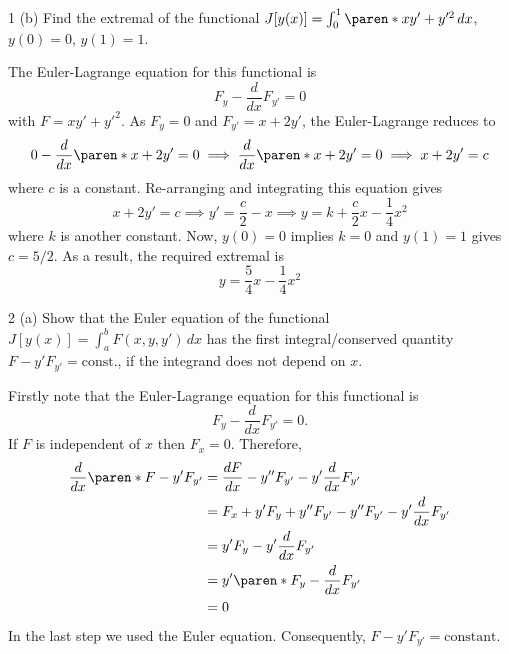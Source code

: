 \documentclass[11pt]{penrose}
\begin{document}
\begin{problem}{1 (b)}
    Find the extremal of the functional $J[y(x)] = \int_0^1 \paren*{xy' + y'^2} \,dx$, $y(0) = 0$, $y(1) = 1$.

    \solution The Euler-Lagrange equation for this functional is
    \begin{equation*}
        F_{y} - \frac{d}{dx}F_{y'}= 0
    \end{equation*}
    with $F = xy' + y'^2$. As $F_{y} = 0$ and $F_{y'} = x + 2y'$, the Euler-Lagrange reduces to
    \begin{equation*}
        0 - \frac{d}{dx}\paren*{x + 2y'}= 0
        \implies
        \frac{d}{dx}\paren*{x + 2y'}= 0
        \implies
        x + 2y' = c
    \end{equation*}
    where $c$ is a constant. Re-arranging and integrating this equation gives
    \begin{equation*}
        x + 2y' = c
        \implies
        y' = \frac{c}{2} - x
        \implies
        y = k + \frac{c}{2}x - \frac{1}{4}x^2
    \end{equation*}
    where $k$ is another constant. Now, $y(0) = 0$ implies $k = 0$ and $y(1) = 1$ gives $c = 5/2$. As a result, the required extremal is
    \begin{equation*}
        y = \frac{5}{4}x - \frac{1}{4}x^2
    \end{equation*}
\end{problem}

\begin{problem}{2 (a)}
    Show that the Euler equation of the functional $J[y(x)] = \int_a^b F(x,y,y') \,dx$ has the first integral/conserved quantity $F - y' F_{y'} = \text{const.}$, if the integrand does not depend on $x$.

    \solution Firstly note that the Euler-Lagrange equation for this functional is
    \begin{equation*}
        F_{y} - \frac{d}{dx}F_{y'} = 0.
    \end{equation*}
    If $F$ is independent of $x$ then $F_x = 0$. Therefore,
    \begin{align*}
        \frac{d}{dx} \paren*{F - y' F_{y'}}
        &= \frac{dF}{dx} - y'' F_{y'} - y' \frac{d}{dx}F_{y'}\\
        &= F_x + y' F_{y} + y'' F_{y'} - y'' F_{y'} - y' \frac{d}{dx}F_{y'}\\
        &= y' F_{y} - y' \frac{d}{dx}F_{y'}\\
        &= y' \paren*{F_{y} - \frac{d}{dx}F_{y'}}\\
        &= 0
    \end{align*}
    In the last step we used the Euler equation. Consequently, $F - y' F_{y'} = \text{constant}$.
\end{problem}
\end{document}
